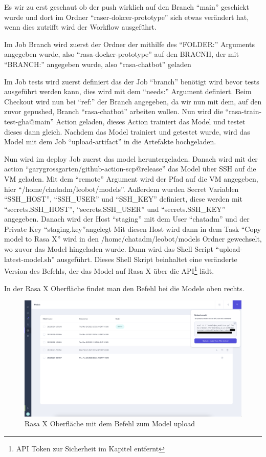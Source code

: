 Es wir zu erst geschaut ob der push wirklich auf den Branch ``main'' geschickt wurde und dort im Ordner ``raser-dokcer-prototype'' sich etwas verändert hat, wenn dies zutrifft wird der Workflow ausgeführt.

Im Job Branch wird zuerst der Ordner der mithilfe des ``FOLDER:'' Arguments angegeben wurde, also ``rasa-docker-prototype'' auf den BRACNH, der mit ``BRANCH:'' angegeben wurde, also ``rasa-chatbot'' geladen

Im Job tests wird zuerst definiert das der Job ``branch'' benötigt wird bevor tests ausgeführt werden kann, dies wird mit dem ``needs:'' Argument definiert.
Beim Checkout wird nun bei ``ref:'' der Branch angegeben, da wir nun mit dem, auf den zuvor gepushed, Branch ``rasa-chatbot'' arbeiten wollen.
Nun wird die ``rasa-train-test-gha@main'' Action geladen, dieses Action trainiert das Model und testet dieses dann gleich.
Nachdem das Model trainiert und getestet wurde, wird das Model mit dem Job ``upload-artifact'' in die Artefakte hochgeladen.

Nun wird im deploy Job zuerst das model heruntergeladen.
Danach wird mit der action ``garygrossgarten/github-action-scp@release'' das Model über SSH auf die VM geladen.
Mit dem ``remote'' Argument wird der Pfad auf die VM angegeben, hier ``/home/chatadm/leobot/models''.
Außerdem wurden Secret Variablen ``SSH\_HOST'', ``SSH\_USER'' und ``SSH\_KEY'' definiert, diese werden mit ``secrets.SSH\_HOST'', ``secrets.SSH\_USER'' und ``secrets.SSH\_KEY'' angegeben.
Danach wird der Host ``staging'' mit dem User ``chatadm'' und der Private Key ``staging.key''angelegt
Mit diesen Host wird dann in dem Task ``Copy model to Rasa X'' wird in den /home/chatadm/leobot/models Ordner gewechselt, wo zuvor das Model hingeladen wurde.
Dann wird das Shell Script ``upload-latest-model.sh'' ausgeführt.
Dieses Shell Skript beinhaltet eine veränderte Version des Befehls, der das Model auf Rasa X über die API\footnote{API Token zur Sicherheit im Kapitel entfernt} lädt.

In der Rasa X Oberfläche findet man den Befehl bei die Modele oben rechts.

\begin{figure}[hbt!]
    \centering
    \includegraphics[scale=0.2]{pics/rasaxapimodel}
    \caption{Rasa X Oberfläche mit dem Befehl zum Model upload}
    \label{fig:impl:rasaxapimodel}
\end{figure}

